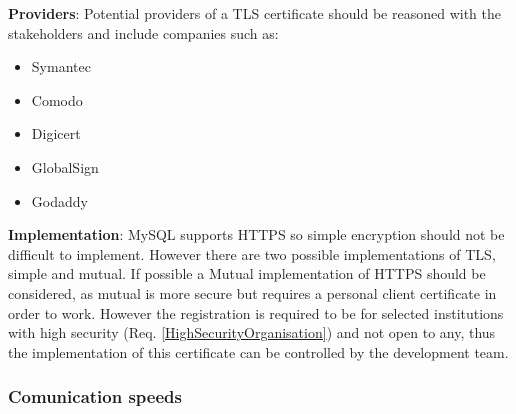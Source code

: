 \documentclass[a4paper,11pt]{article}
\begin{document}
\textbf{Providers}: Potential providers of a TLS certificate should be reasoned with the stakeholders and include companies such as:
\begin{itemize}
\item   Symantec
\item	Comodo
\item	Digicert
\item	GlobalSign 
\item	Godaddy
\end{itemize}
\textbf{Implementation}:
MySQL supports HTTPS so simple encryption should not be difficult to implement. However there are two possible implementations of TLS, simple and mutual. If possible a Mutual implementation of HTTPS should be considered, as mutual is more secure but requires a personal client certificate in order to work. However the registration is required to be for selected institutions with high security (Req. \ref{HighSecurityOrganisation}) and not open to any, thus the implementation of this certificate can be controlled by the development team.
	
\subsubsection{Comunication speeds}
	
\end{document}

